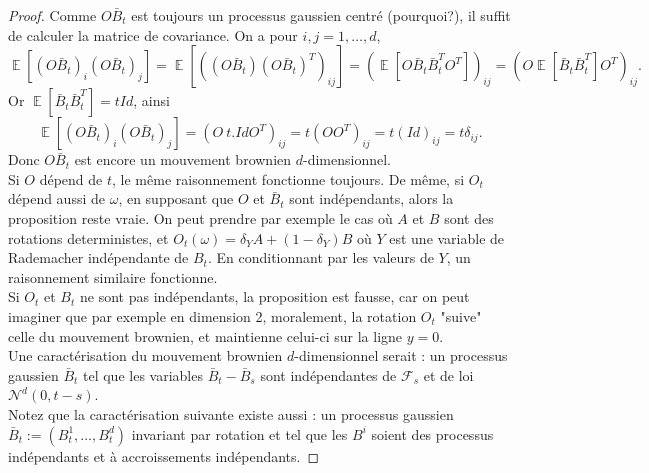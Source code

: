 \documentclass{article}
\theoremstyle{definition}
\numberwithin{equation}{section}
\DeclareMathOperator{\E}{\mathbb{E}}
\begin{document}
\begin{proof}
Comme $O\bar{B}_t$ est toujours un processus gaussien centré (pourquoi?), il suffit de calculer la matrice de covariance. On a pour $i,j=1,\dots,d$,
$$ \E[(O\bar{B}_t)_i(O\bar{B}_t)_j]=\E[((O\bar{B}_t)(O\bar{B}_t)^T)_{ij}]=(\E[O\bar{B}_t\bar{B}_t^TO^T])_{ij}=(O\E[\bar{B}_t\bar{B}_t^T]O^T)_{ij}. $$
Or $\E[\bar{B}_t\bar{B}_t^T]=t Id$, ainsi
$$ \E[(O\bar{B}_t)_i(O\bar{B}_t)_j] = (O~ t.Id O^T)_{ij} = t(O O^T)_{ij} = t(Id)_{ij} = t\delta_{ij}.$$
Donc $O\bar{B}_t$ est encore un mouvement brownien $d$-dimensionnel.\\
Si $O$ dépend de $t$, le même raisonnement fonctionne toujours. De même, si $O_t$ dépend aussi de $\omega$, en supposant que $O$ et $\bar{B}_t$ sont indépendants, alors la proposition reste vraie. On peut prendre par exemple le cas où $A$ et $B$ sont des rotations deterministes, et $O_t(\omega)=\delta_Y A + (1-\delta_Y)B$ où $Y$ est une variable de Rademacher indépendante de $B_t$. En conditionnant par les valeurs de $Y$, un raisonnement similaire fonctionne.\\
 Si $O_t$ et $B_t$ ne sont pas indépendants, la proposition est fausse, car on peut imaginer que par exemple en dimension 2, moralement, la rotation $O_t$ "suive" celle du mouvement brownien, et maintienne celui-ci sur la ligne $y=0$.\\
Une caractérisation du mouvement brownien $d$-dimensionnel serait : un processus gaussien $\bar{B}_t$ tel que les variables $\bar{B}_t-\bar{B}_s$ sont indépendantes de $\mathcal{F}_s$ et de loi $\mathcal{N}^d(0,t-s)$.\\
Notez que la caractérisation suivante existe aussi : un processus gaussien $\bar{B}_t:=(B^1_t,\dots,B^d_t)$ invariant par rotation et tel que les $B^i$ soient des processus indépendants et à accroissements indépendants.
\end{proof}
\end{document}
